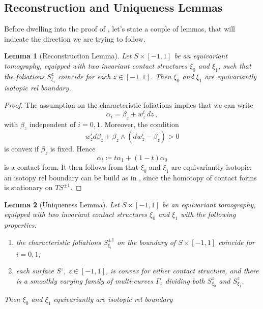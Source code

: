 \documentclass[a4paper, 11pt]{amsart}
\theoremstyle{plain}
\newtheorem{lemma}[lemma]{Lemma}
\theoremstyle{definition}
\begin{document}
\subsection{Reconstruction and Uniqueness Lemmas}
Before dwelling into the proof of , let's state a couple of lemmas, that will indicate the direction we are trying to follow.
\begin{lemma}[Reconstruction Lemma]
	Let $S \times [-1,1]$ be an equivariant tomography, equipped with two invariant contact structures $\xi_0$ and $\xi_1$, such that the foliations $S^z_{\xi_i}$ coincide for each $z \in [-1,1]$. Then $\xi_0$ and $\xi_1$ are equivariantly isotopic rel boundary.
\end{lemma}
\begin{proof}
	The assumption on the characteristic foliations implies that we can write
	\[
		\alpha_i = \beta_z + w^i_z\,dz\,,
	\]
	with $\beta_z$ independent of $i = 0,1$. Moreover, the condition
	\[
		 w_z^i d\beta_z +\beta_z \wedge (dw_z^i - \dot{\beta}_z) > 0
	\]
	is convex if $\beta_z$ is fixed. Hence
	\[
		\alpha_t \coloneqq t\alpha_1 + (1-t)\alpha_0
	\]
	is a contact form. It then follows from  that $\xi_0$ and $\xi_1$ are equivariantly isotopic; an isotopy rel boundary can be build as in , since the homotopy of contact forms is stationary on $TS^{\pm 1}$.
\end{proof}
\begin{lemma}[Uniqueness Lemma]\label{uniqueness}
	Let $S \times [-1,1]$ be an equivariant tomography, equipped with two invariant contact structures $\xi_0$ and $\xi_1$ with the following properties:
	\begin{enumerate}
	\item the characteristic foliations $S^{\pm 1}_{\xi_i}$ on the boundary of $S \times [-1,1]$ coincide for $i =0,1$;
	\item each surface $S^z$, $z \in [-1,1]$, is convex for either contact structure, and there is a smoothly varying family of multi-curves $\Gamma_z$ dividing both $S^z_{\xi_0}$	and $S^z_{\xi_1}$.
	\end{enumerate}
	Then $\xi_0$ and $\xi_1$ equivariantly are isotopic rel boundary
\end{lemma}
\end{document}
